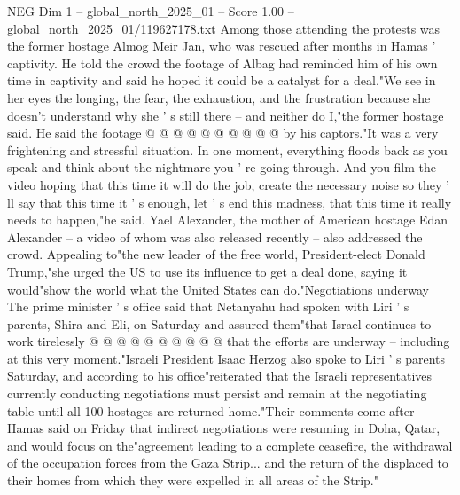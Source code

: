 \begin{textsample}{NEG Dim 1 – global\_north\_2025\_01 – Score 1.00 – global\_north\_2025\_01/119627178.txt}
Among those attending the protests was the former hostage Almog Meir Jan, who was rescued after months in Hamas ' captivity.
He told the crowd the footage of Albag had reminded him of his own time in captivity and said he hoped it could be a catalyst for a deal."We see in her eyes the longing, the fear, the exhaustion, and the frustration because she doesn't understand why she ' s still there -- and neither do I,"the former hostage said.
He said the footage @ @ @ @ @ @ @ @ @ @ by his captors."It was a very frightening and stressful situation.
In one moment, everything floods back as you speak and think about the nightmare you ' re going through.
And you film the video hoping that this time it will do the job, create the necessary noise so they ' ll say that this time it ' s enough, let ' s end this madness, that this time it really needs to happen,"he said.
Yael Alexander, the mother of American hostage Edan Alexander -- a video of whom was also released recently -- also addressed the crowd.
Appealing to"the new leader of the free world, President-elect Donald Trump,"she urged the US to use its influence to get a deal done, saying it would"show the world what the United States can do."Negotiations underway The prime minister ' s office said that Netanyahu had spoken with Liri ' s parents, Shira and Eli, on Saturday and assured them"that Israel continues to work tirelessly @ @ @ @ @ @ @ @ @ @ that the efforts are underway -- including at this very moment."Israeli President Isaac Herzog also spoke to Liri ' s parents Saturday, and according to his office"reiterated that the Israeli representatives currently conducting negotiations must persist and remain at the negotiating table until all 100 hostages are returned home."Their comments come after Hamas said on Friday that indirect negotiations were resuming in Doha, Qatar, and would focus on the"agreement leading to a complete ceasefire, the withdrawal of the occupation forces from the Gaza Strip... and the return of the displaced to their homes from which they were expelled in all areas of the Strip."

\end{textsample}
